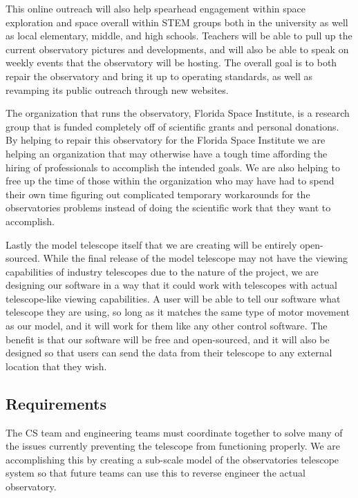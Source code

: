 \documentclass[12pt]{article}
\begin{document}
This online outreach will also help spearhead engagement within space exploration and space overall within STEM groups both in the university as well as local elementary, middle, and high schools. Teachers will be able to pull up the current observatory pictures and developments, and will also be able to speak on weekly events that the observatory will be hosting. The overall goal is to both repair the observatory and bring it up to operating standards, as well as revamping its public outreach through new websites.

The organization that runs the observatory, Florida Space Institute, is a research group that is funded completely off of scientific grants and personal donations. By helping to repair this observatory for the Florida Space Institute we are helping an organization that may otherwise have a tough time affording the hiring of professionals to accomplish the intended goals. We are also helping to free up the time of those within the organization who may have had to spend their own time figuring out complicated temporary workarounds for the observatories problems instead of doing the scientific work that they want to accomplish.

Lastly the model telescope itself that we are creating will be entirely open-sourced. While the final release of the model telescope may not have the viewing capabilities of industry telescopes due to the nature of the project, we are designing our software in a way that it could work with telescopes with actual telescope-like viewing capabilities. A user will be able to tell our software what telescope they are using, so long as it matches the same type of motor movement as our model, and it will work for them like any other control software. The benefit is that our software will be free and open-sourced, and it will also be designed so that users can send the data from their telescope to any external location that they wish.

\subsection{Requirements}

The CS team and engineering teams must coordinate together to solve many of the issues currently preventing the telescope from functioning properly. We are accomplishing this by creating a sub-scale model of the observatories telescope system so that future teams can use this to reverse engineer the actual observatory. 
\end{document}
